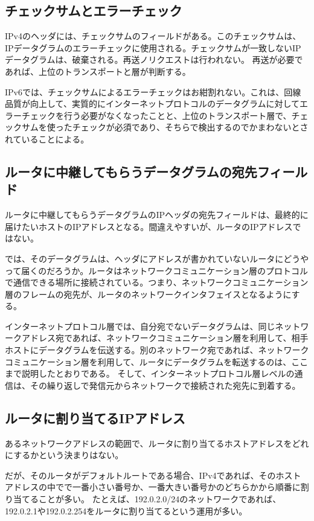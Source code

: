 \subsection{チェックサムとエラーチェック}

IPv4のヘッダには、チェックサムのフィールドがある。このチェックサムは、IPデータグラムのエラーチェックに使用される。チェックサムが一致しないIPデータグラムは、破棄される。再送ノリクエストは行われない。
再送が必要であれば、上位のトランスポートと層が判断する。

IPv6では、チェックサムによるエラーチェックはお紺割れない。これは、回線品質が向上して、実質的にインターネットプロトコルのデータグラムに対してエラーチェックを行う必要がなくなったことと、上位のトランスポート層で、チェックサムを使ったチェックが必須であり、そちらで検出するのでかまわないとされていることによる。

\subsection{ルータに中継してもらうデータグラムの宛先フィールド}

ルータに中継してもらうデータグラムのIPヘッダの宛先フィールドは、最終的に届けたいホストのIPアドレスとなる。間違えやすいが、ルータのIPアドレスではない。


では、そのデータグラムは、ヘッダにアドレスが書かれていないルータにどうやって届くのだろうか。ルータはネットワークコミュニケーション層のプロトコルで通信できる場所に接続されている。つまり、ネットワークコミュニケーション層のフレームの宛先が、ルータのネットワークインタフェイスとなるようにする。

インターネットプロトコル層では、自分宛でないデータグラムは、同じネットワークアドレス宛であれば、ネットワークコミュニケーション層を利用して、相手ホストにデータグラムを伝送する。別のネットワーク宛であれば、ネットワークコミュニケーション層を利用して、ルータにデータグラムを転送するのは、ここまで説明したとおりである。
そして、インターネットプロトコル層レベルの通信は、その繰り返しで発信元からネットワークで接続された宛先に到着する。


\subsection{ルータに割り当てるIPアドレス}
あるネットワークアドレスの範囲で、ルータに割り当てるホストアドレスをどれにするかという決まりはない。

だが、そのルータがデフォルトルートである場合、IPv4であれば、そのホストアドレスの中でで一番小さい番号か、一番大きい番号かのどちらかから順番に割り当てることが多い。
たとえば、192.0.2.0/24のネットワークであれば、192.0.2.1や192.0.2.254をルータに割り当てるという運用が多い。


